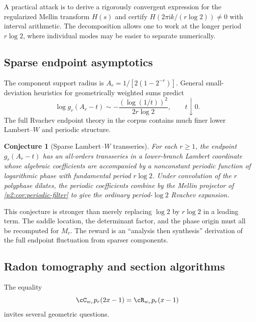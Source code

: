\documentclass[11pt,oneside]{article}
\newtheorem{conjecture}[theorem]{Conjecture}
\theoremstyle{definition}
\newcommand{\ii}{\mathrm i}
\begin{document}
A practical attack is to derive a rigorously convergent expression for the
regularized Mellin transform $H(s)$ and certify $H(2\pi\ii k/(r\log2))\ne0$
with interval arithmetic.  The decomposition allows one to work at the longer
period $r\log2$, where individual modes may be easier to separate numerically.

\subsection{Sparse endpoint asymptotics}

The component support radius is $A_r=1/[2(1-2^{-r})]$.  General small-deviation
heuristics for geometrically weighted sums predict
\begin{equation}
 \log g_r(A_r-t)
 \sim-\frac{(\log(1/t))^2}{2r\log2},
 \qquad t\downarrow0.                                    \label{p2:eq:sparse-leading-endpoint}
\end{equation}
The full Rvachev endpoint theory in the corpus contains much finer lower
Lambert--$W$ and periodic structure.

\begin{conjecture}[Sparse Lambert--$W$ transseries]
\label{p2:conj:sparse-Lambert}
For each $r\ge1$, the endpoint $g_r(A_r-t)$ has an all-orders transseries in a
lower-branch Lambert coordinate whose algebraic coefficients are accompanied
by a nonconstant periodic function of logarithmic phase with fundamental
period $r\log2$.  Under convolution of the $r$ polyphase dilates, the periodic
coefficients combine by the Mellin projector of
\cref{p2:cor:periodic-filter} to give the ordinary period-$\log2$ Rvachev
expansion.
\end{conjecture}

This conjecture is stronger than merely replacing $\log2$ by $r\log2$ in a leading term.  The saddle location, the determinant
factor, and the phase origin must all be recomputed for $M_r$.  The reward is an
``analysis then synthesis'' derivation of the full endpoint fluctuation from
sparser components.

\subsection{Radon tomography and section algorithms}

The equality
\begin{equation}
 \cC_{w_r}p_r(2x-1)=\cR_{w_r}p_r(x-1)                      \label{p2:eq:tomography-core}
\end{equation}
invites several geometric questions.
\end{document}

